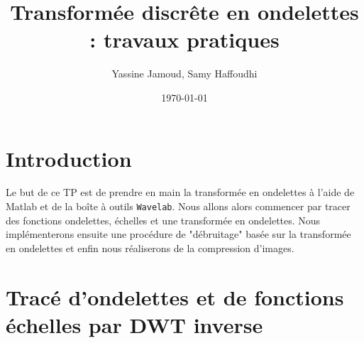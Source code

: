 \documentclass[12pt,a4paper,titlepage]{article}
\title{Transformée discrête en ondelettes : travaux pratiques}
\author{Yassine Jamoud, Samy Haffoudhi}
\date{\today}
\begin{document}
\maketitle

\section*{Introduction}

Le but de ce TP est de prendre en main la transformée en ondelettes à l'aide de Matlab et de
la boîte à outils \texttt{Wavelab}. Nous allons alors commencer par tracer des fonctions ondelettes,
échelles et une transformée en ondelettes. Nous implémenterons ensuite une procédure de
"débruitage" basée sur la transformée en ondelettes et enfin nous réaliserons de la compression
d'images.

\section{Tracé d'ondelettes et de fonctions échelles par DWT inverse}
\end{document}
